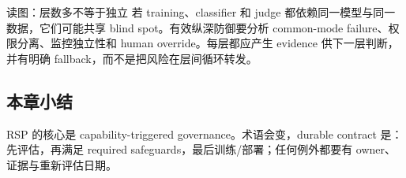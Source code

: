
\begin{knowledgebox}{读图：层数多不等于独立}
若 training、classifier 和 judge 都依赖同一模型与同一数据，它们可能共享 blind spot。有效纵深防御要分析 common-mode failure、权限分离、监控独立性和 human override。每层都应产生 evidence 供下一层判断，并有明确 fallback，而不是把风险在层间循环转发。
\end{knowledgebox}

\subsection{本章小结}

RSP 的核心是 capability-triggered governance。术语会变，durable contract 是：先评估，再满足 required safeguards，最后训练/部署；任何例外都要有 owner、证据与重新评估日期。

